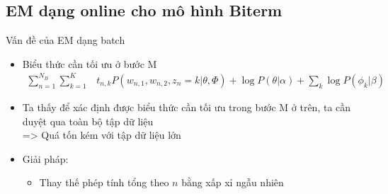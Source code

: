 \documentclass[pdf]{beamer}
\begin{document}

\subsection{EM dạng online cho mô hình Biterm}

\begin{frame}{Vấn đề của EM dạng batch}
	\begin{itemize}
		\item 	Biểu thức cần tối ưu ở bước M
			\begin{align}
				\sum_{n=1}^{N_{B}} \sum_{k=1}^{K} & t_{n,k}P(w_{n,1},w_{n,2},z_{n}=k|\theta,\Phi) + \log P(\theta|\alpha) + \sum_{k} \log P(\phi_{k}|\beta) \label{eq:mBTM}
			\end{align}
		\item Ta thấy để xác định được biểu thức cần tối ưu trong bước M ở trên, ta cần duyệt qua toàn bộ tập dữ liệu \\
		=> Quá tốn kém với tập dữ liệu lớn
		\item 	Giải pháp:
			\begin{itemize}
				\item Thay thế phép tính tổng theo $n$ bằng xấp xỉ ngẫu nhiên
			\end{itemize}
	\end{itemize}
\end{frame}
\end{document}
